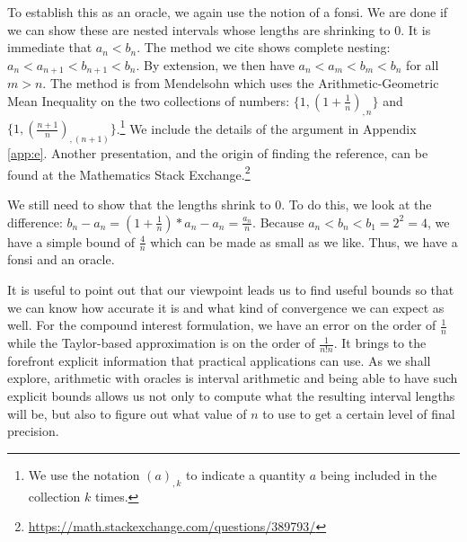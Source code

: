 \documentclass[12pt]{article}
\begin{document}
To establish this as an oracle, we again use the notion of a fonsi. We are done if we can show these are nested intervals whose lengths are shrinking to 0. It is immediate that $a_n < b_n$. The method we cite shows complete nesting: $a_n < a_{n+1} < b_{n+1} < b_n$. By extension, we then have $a_n < a_m < b_m < b_n$ for all $m > n$. The method is from Mendelsohn \cite{mend} which uses the Arithmetic-Geometric Mean Inequality on the two collections of numbers: $\{1, (1+ \frac{1}{n})_{,n} \}$ and $\{1, (\frac{n+1}{n})_{,(n+1)}\}$.\footnote{We use the notation $(a)_{,k}$ to indicate a quantity $a$ being included in the collection $k$ times.} We include the details of the argument in Appendix \ref{app:e}.  Another presentation, and the origin of finding the reference, can be found at the Mathematics Stack Exchange.\footnote{ \url{https://math.stackexchange.com/questions/389793/}}

We still need to show that the lengths shrink to 0. To do this, we look at the difference: $b_n - a_n = (1+\tfrac{1}{n})*a_n - a_n = \tfrac{a_n}{n}$. Because $a_n < b_n < b_1=2^2 = 4$, we have a simple bound of $\tfrac{4}{n}$ which can be made as small as we like. Thus, we have a fonsi and an oracle. 

It is useful to point out that our viewpoint leads us to find useful bounds so that we can know how accurate it is and what kind of convergence we can expect as well. For the compound interest formulation, we have an error on the order of $\frac{1}{n}$ while the Taylor-based approximation is on the order of $\frac{1}{n! n}$. It brings to the forefront explicit information that practical applications can use. As we shall explore, arithmetic with oracles is interval arithmetic and being able to have such explicit bounds allows us not only to compute what the resulting interval lengths will be, but also to figure out what value of $n$ to use to get a certain level of final precision. 
\end{document}
